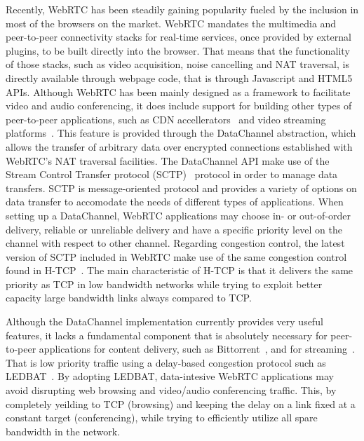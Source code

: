 \documentclass{sig-alternate}
\begin{document}

Recently, WebRTC has been steadily gaining popularity fueled by the inclusion in most of
the browsers on the market. WebRTC mandates the multimedia and peer-to-peer connectivity
stacks for real-time services, once provided by external plugins, to be built directly
into the browser. That means that the functionality of those stacks, such as video
acquisition, noise cancelling and NAT traversal, is directly available through webpage
code, that is through Javascript and HTML5 APIs. Although WebRTC has been mainly designed
as a framework to facilitate video and audio conferencing, it does include support for
building other types of peer-to-peer applications, such as CDN
accellerators~\cite{peerCDN} and video streaming platforms~\cite{nurminen2013p2p}. This
feature is provided through the DataChannel abstraction, which allows the transfer of
arbitrary data over encrypted connections established with WebRTC's NAT traversal
facilities. The DataChannel API make use of the Stream Control Transfer protocol
(SCTP)~\cite{sctp} protocol in order to manage data transfers. SCTP is message-oriented
protocol and provides a variety of options on data transfer to accomodate the needs of
different types of applications. When setting up a DataChannel, WebRTC applications may
choose in- or out-of-order delivery, reliable or unreliable delivery and have a specific
priority level on the channel with respect to other channel. Regarding congestion control,
the latest version of SCTP included in WebRTC make use of the same congestion control
found in H-TCP~\cite{htcp}. The main characteristic of H-TCP is that it delivers the same
priority as TCP in low bandwidth networks while trying to exploit better capacity large
bandwidth links always compared to TCP.

Although the DataChannel implementation currently provides very useful features, it lacks
a fundamental component that is absolutely necessary for peer-to-peer applications for
content delivery, such as Bittorrent~\cite{bittorrent}, and for
streaming~\cite{smoothcache}\cite{roberto-thesis}. That is low priority traffic using a
delay-based congestion protocol such as LEDBAT~\cite{ledbat}. By adopting LEDBAT, data-intesive
WebRTC applications may avoid disrupting web browsing and video/audio conferencing
traffic. This, by completely yeilding to TCP (browsing) and keeping the delay on a link
fixed at a constant target (conferencing), while trying to efficiently utilize all spare
bandwidth in the network.
\end{document}
